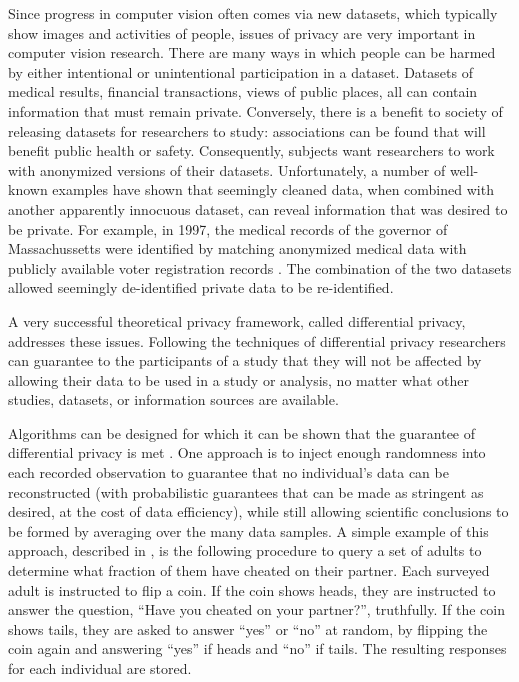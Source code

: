 Since progress in computer vision often comes via new datasets, which typically show images and activities of people, issues of privacy are very important in computer vision research.  There are many ways in which people can be harmed by either intentional or unintentional participation in a dataset.  Datasets of medical results, financial transactions, views of public places, all can contain information that must remain private.
Conversely, there is a benefit to society of releasing datasets for researchers to study:  associations can be found that will benefit public health or safety.  Consequently, subjects want researchers to work with anonymized versions of their datasets.  Unfortunately, a number of well-known examples have shown that seemingly cleaned data, when combined with another apparently innocuous dataset, can reveal information that was desired to be private.  For example, in 1997, the medical records of the governor of Massachussetts were identified by matching anonymized medical
data with publicly available voter registration records \cite{Kearns2020,Dwork2014}. 
The combination of the two datasets allowed seemingly de-identified private data to be re-identified.


A very successful theoretical privacy framework, called differential privacy, addresses these issues.
Following the techniques of differential privacy \cite{Dwork2014}  researchers can guarantee to the participants of a study that they will not be affected by allowing their data to be used in a study or analysis,
no matter what other studies, datasets, or information sources are available.


Algorithms can be designed for which it can be shown that the guarantee of differential privacy is met
\cite{Kearns2020,Dwork2014}.  One approach is to inject enough randomness into each recorded observation to guarantee that no individual's data can be reconstructed (with probabilistic guarantees that can be made as stringent as desired, at the cost of data efficiency), while still allowing scientific conclusions to be formed by averaging over the many data samples.
A simple example of this approach, described in \cite{Kearns2020}, is the following procedure to query a set of adults to determine what fraction of them have cheated on their partner.  Each surveyed adult is instructed to flip a coin.  If the coin shows heads, they are instructed to answer the question, ``Have you cheated on your partner?'',  truthfully.  If the coin shows tails, they are asked to answer ``yes'' or ``no'' at random, by flipping the coin again and answering ``yes'' if heads and ``no'' if tails.  The resulting responses for each individual are stored.



